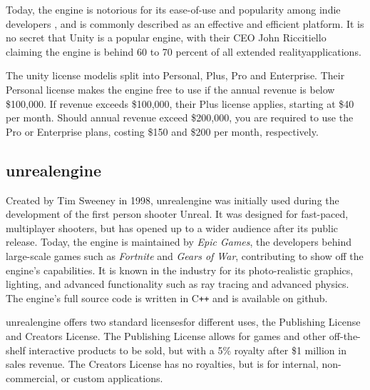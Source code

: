 Today, the engine is notorious for its ease-of-use and popularity among indie developers \cite{unity_dealessandri_2020}, and is commonly described as an effective and efficient platform.  \cite{stepico_games_2021} It is no secret that Unity is a popular engine, with their CEO John Riccitiello claiming the engine is behind 60 to 70 percent of all extended reality\footnotemark[1] applications. \cite{chaudry_2020}


The \Gls{unity} license model\footnotemark[2] is split into Personal, Plus, Pro and Enterprise. Their Personal license makes the engine free to use if the annual revenue is below \$100,000. If revenue exceeds \$100,000, their Plus license applies, starting at \$40 per month. Should annual revenue exceed \$200,000, you are required to use the Pro or Enterprise plans, costing \$150 and \$200 per month, respectively. 



\subsection{\Gls{unrealengine}}
Created by Tim Sweeney in 1998, \Gls{unrealengine} was initially used during the development of the first person shooter Unreal. It was designed for fast-paced, multiplayer shooters, but has opened up to a wider audience after its public release. Today, the engine is maintained by \textit{Epic Games}, the developers behind large-scale games such as \textit{Fortnite} and \textit{Gears of War}, contributing to show off the engine's capabilities. It is known in the industry for its photo-realistic graphics, lighting, and advanced functionality such as ray tracing and advanced physics. The engine's full source code is written in C\texttt{++} and is available on \Gls{github}\footnotemark[1].

\Gls{unrealengine} offers two standard licenses\footnotemark[2] for different uses, the Publishing License and Creators License. The Publishing License allows for games and other off-the-shelf interactive products to be sold, but with a 5\% royalty after \$1 million in sales revenue. The Creators License has no royalties, but is for internal, non-commercial, or custom applications. \cite{unreal_licence}

